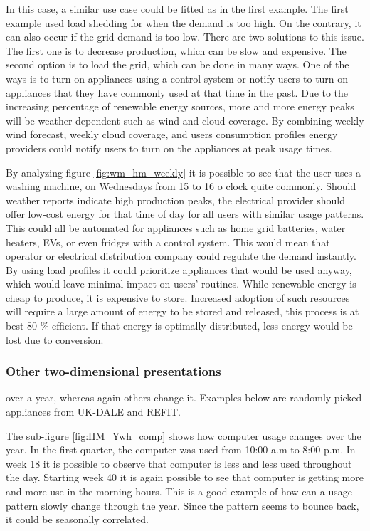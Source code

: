 In this case, a similar use case could be fitted as in the first example.
The first example used load shedding for when the demand is too high.
On the contrary, it can also occur if the grid demand is too low.
There are two solutions to this issue.
The first one is to decrease production, which can be slow and expensive.
The second option is to load the grid, which can be done in many ways.
One of the ways is to turn on appliances using a control system or notify users to turn on appliances that they have commonly used at that time in the past. 
Due to the increasing percentage of renewable energy sources, more and more energy peaks will be weather dependent such as wind and cloud coverage.
By combining weekly wind forecast, weekly cloud coverage, and users consumption profiles energy providers could notify users to turn on the appliances at peak usage times.

By analyzing figure \ref{fig:wm_hm_weekly} it is possible to see that the user uses a washing machine,
on Wednesdays from  15 to 16 o clock quite commonly. 
Should weather reports indicate high production peaks, the electrical provider should offer low-cost energy for that time of day for all users with similar usage patterns. 
This could all be automated for appliances such as home grid batteries, water heaters, EVs, or even fridges with a control system.
This would mean that operator or electrical distribution company could regulate the demand instantly.
By using load profiles it could prioritize appliances that would be used anyway, which would leave minimal impact on users' routines. 
While renewable energy is cheap to produce, it is expensive to store.
Increased adoption of such resources will require a large amount of energy to be stored and released, this process is at best 80 \% efficient.
If that energy is optimally distributed, less energy would be lost due to conversion.

\subsubsection{Other two-dimensional presentations}

over a year, whereas again others change it. Examples below are randomly picked appliances
from UK-DALE and REFIT. 

The sub-figure \ref{fig:HM_Ywh_comp} shows how computer usage changes over the year.
In the first quarter, the computer was used from 10:00 a.m to 8:00 p.m.
In week 18 it is possible to observe that computer is less and less used throughout the day. 
Starting week 40 it is again possible to see that computer is getting more and more use in the morning hours. 
This is a good example of how can a usage pattern slowly change through the year. 
Since the pattern seems to bounce back, it could be seasonally correlated. 

